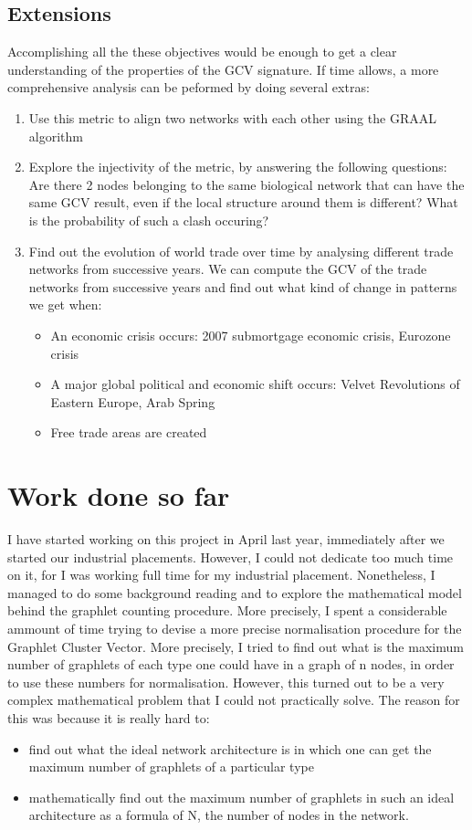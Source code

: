 \subsection{Extensions}
Accomplishing all the these objectives would be enough to get a clear
understanding of the properties of the GCV signature. If time allows, a more
comprehensive analysis can be peformed by doing several extras:
\begin{enumerate}
 \item Use this metric to align two networks with each other using the GRAAL
algorithm\cite{memivsevic2012c}
 \item Explore the injectivity of the metric, by answering the following
questions: Are there 2 nodes belonging to the same biological network that can
have the same GCV result, even if the local structure around them is different?
What is the probability of such a clash occuring?
 \item Find out the evolution of world trade over time by analysing different
trade networks from successive years. We can compute the GCV of the trade
networks from successive years and find out what kind of change in patterns we
get when:
 \begin{itemize}
  \item An economic crisis occurs: 2007 submortgage economic crisis, Eurozone
crisis
  \item A major global political and economic shift occurs: Velvet Revolutions
of Eastern Europe, Arab Spring
  \item Free trade areas are created
 \end{itemize}

\end{enumerate}

\section{Work done so far}

I have started working on this project in April last year, immediately after we
started our industrial placements. However, I could not dedicate too much time
on it, for I was working full time for my industrial placement. Nonetheless, I
managed to do some background reading and to explore the mathematical model
behind the graphlet counting procedure. More precisely, I spent a considerable
ammount of time trying to devise a more precise normalisation procedure for the
Graphlet Cluster Vector. More precisely, I tried to find out what is the
maximum number of graphlets of each type one could have in a graph of n
nodes, in order to use these numbers for normalisation. However, this turned out
to be a very complex mathematical problem that I could not practically solve.
The reason for this was because it is really hard to:
\begin{itemize}
 \item find out what the ideal network architecture is in which one can get
the maximum number of graphlets of a particular type
 \item mathematically find out the maximum number of graphlets in such an ideal
architecture as a formula of N, the number of nodes in the network.
\end{itemize}

